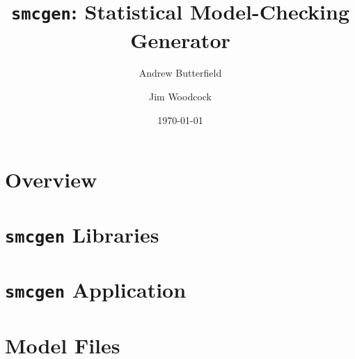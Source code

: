 \documentclass[fleqn,10pt]{report}
\author{
Andrew Butterfield \and Jim Woodcock
}
\title{
  \texttt{smcgen}:
  Statistical Model-Checking Generator
}
\date{
\today
}
\begin{document}
\maketitle
\tableofcontents

\chapter{Overview}



\chapter{\texttt{smcgen} Libraries}

\newpage

\newpage

\newpage

\newpage


% 

\chapter{\texttt{smcgen} Application}



%
%
%
\chapter{Model Files}
%




\end{document}
